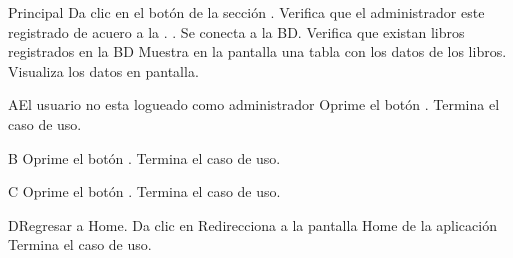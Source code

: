 	\begin{UCtrayectoria}{Principal}
		\UCpaso[\UCactor] Da clic en el botón  de la sección  .
		\UCpaso[\UCsist] Verifica que el administrador este registrado de acuero a la  . .
		\UCpaso[\UCsist] Se conecta a la BD. 
		\UCpaso[\UCsist] Verifica que existan libros registrados en la BD 
		\UCpaso[\UCsist] Muestra en la pantalla  una tabla con los datos de los libros. 
		\UCpaso[\UCactor] Visualiza los datos en pantalla. 
	\end{UCtrayectoria}
		\begin{UCtrayectoriaA}{A}{El usuario no esta logueado como administrador }
			\UCpaso[\UCactor] Oprime el botón .
			\UCpaso[\UCsist] Termina el caso de uso.
		\end{UCtrayectoriaA}
		\begin{UCtrayectoriaA}{B}{}
			\UCpaso[\UCactor] Oprime el botón .
			\UCpaso[\UCsist] Termina el caso de uso.
		\end{UCtrayectoriaA}
		\begin{UCtrayectoriaA}{C}{}
			\UCpaso[\UCactor] Oprime el botón .
			\UCpaso[\UCsist] Termina el caso de uso.
		\end{UCtrayectoriaA}
		\begin{UCtrayectoriaA}{D}{Regresar a Home.}
			\UCpaso[\UCactor] Da clic en 
			\UCpaso[\UCsist] Redirecciona a la pantalla Home de la aplicación
			\UCpaso[\UCsist] Termina el caso de uso.
		\end{UCtrayectoriaA}
		
		
